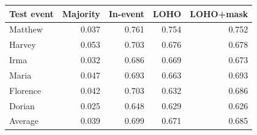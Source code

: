 \begin{tabular}{lrrrr}
\toprule
Test event & Majority & In-event & LOHO & LOHO+mask \\
\midrule
Matthew & 0.037 & 0.761 & 0.754 & 0.752 \\
Harvey & 0.053 & 0.703 & 0.676 & 0.678 \\
Irma & 0.032 & 0.686 & 0.669 & 0.673 \\
Maria & 0.047 & 0.693 & 0.663 & 0.693 \\
Florence & 0.042 & 0.703 & 0.632 & 0.686 \\
Dorian & 0.025 & 0.648 & 0.629 & 0.626 \\
\midrule
Average & 0.039 & 0.699 & 0.671 & 0.685 \\
\bottomrule
\end{tabular}
